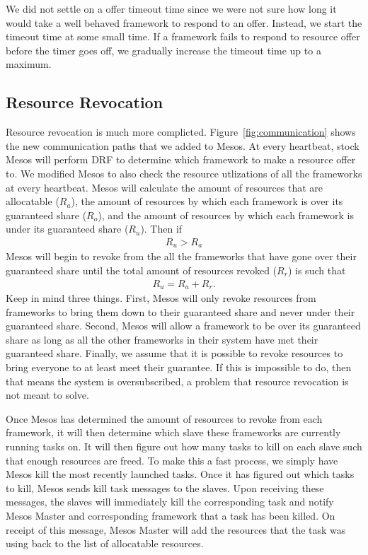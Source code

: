 We did not settle on a offer timeout time since we were not sure how long it would take a well behaved
framework to respond to an offer. Instead, we start the timeout time at some small time. If a framework
fails to respond to resource offer before the timer goes off, we gradually increase the timeout time
up to a maximum. 

\subsection{Resource Revocation}
Resource revocation is much more complicted. Figure~\ref{fig:communication} shows the new
communication paths that we added to Mesos. At every heartbeat, stock Mesos will perform DRF to
determine which framework to make a resource offer to. We modified Mesos to also check the resource
utlizations of all the frameworks at every heartbeat. Mesos will calculate the amount of resources that
are allocatable ($R_a$), the amount of resources by which each framework is over its guaranteed
share ($R_o$), and the amount of resources by which each framework is under its guaranteed share 
($R_u$). Then if 
\begin{align*}
  R_u > R_a
\end{align*}
Mesos will begin to revoke from the all the frameworks that have gone over their guaranteed share until
the total amount of resources revoked ($R_r$) is such that
\begin{align*}
  R_u = R_a + R_r.
\end{align*}
Keep in mind three things. First, Mesos will only revoke resources from frameworks to bring them down to
their guaranteed share and never under their guaranteed share. Second, Mesos will allow a framework to 
be over its guaranteed share as long as all the other frameworks in their system have met their
guaranteed share. Finally, we assume that it is possible to revoke resources to bring everyone to at
least meet their guarantee. If this is impossible to do, then that means the system is oversubscribed,
a problem that resource revocation is not meant to solve.

Once Mesos has determined the amount of resources to revoke from each framework, it will then determine
which slave these frameworks are currently running tasks on. It will then figure out how many tasks to
kill on each slave such that enough resources are freed. To make this a fast process, we simply have
Mesos kill the most recently launched tasks. Once it has figured out which tasks to kill, Mesos sends
kill task messages to the slaves. Upon receiving these messages, the slaves will immediately kill the
corresponding task and notify Mesos Master and corresponding framework that a task has been killed. On
receipt of this message, Mesos Master will add the resources that the task was using back to the list
of allocatable resources. 
